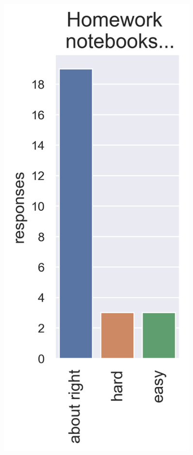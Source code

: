 \documentclass[aspectratio=169]{beamer}
\begin{document}
\begin{frame}[t]
\begin{columns}
\begin{figure}
\includegraphics[width=0.9\textwidth]{survey_hw}
\caption*{}
\end{figure}


\end{columns}
\end{frame}
\end{document}
